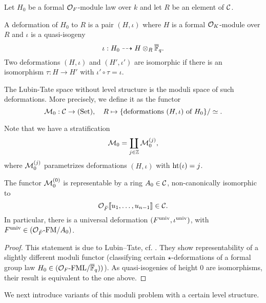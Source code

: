 \documentclass[../main.tex]{subfiles}
\begin{document}
Let $H_0$ be a formal $\mathcal{O}_F$-module law over $k$ and let $R$ be an element of 
$\mathcal{C}$.

\begin{defi}[Deformation]
  A deformation of $H_0$ to $R$ is a pair $(H, \iota)$ where
  $H$ is a formal $\mathcal{O}_K$-module over $R$ and $\iota$ is a quasi-isogeny
  \begin{equation*}
    \iota: H_0 \dashrightarrow H \otimes_R {\overline {\mathbb{F}}_q}.
  \end{equation*}
  Two deformations $(H, \iota)$ and $(H', \iota')$ are isomorphic if there is
  an isomorphism $\tau: H \to H'$ with $\iota' \circ \tau = \iota$. 
\end{defi}
The Lubin-Tate space without level structure is the moduli space of such deformations.
More precisely, we define it as the functor
\begin{equation*}
  \mathcal{M}_0: \mathcal{C} \to {(\mathrm{Set})}, \quad R \mapsto \{\text{deformations } (H, \iota) \text{
  of $H_0$}\}/\simeq.
\end{equation*}

Note that we have a stratification
\begin{equation*}
  \mathcal{M}_0 = \coprod_{j \in \mathbb{Z}} \mathcal{M}_0^{(j)},
\end{equation*}
where $\mathcal{M}_0^{(j)}$ parametrizes deformations $(H, \iota)$ with $\textnormal{ht}(\iota) = j$.

\begin{thm}[Representability of $\cM_0$]\label{thm:RepresentabilityOfDefSpaceWOLevel}
  The functor $\mathcal{M}_0^{(0)}$ is representable by a ring $A_0 \in \mathcal{C}$, non-canonically 
  isomorphic to
  \begin{equation*}
    \mathcal{O}_{\breve {F}}\llbracket u_1, \dots, u_{n-1} \rrbracket \in \mathcal{C}.
  \end{equation*}
In particular, there is a universal deformation
$(F^{\mathrm{univ}}, \iota^{\mathrm{univ}})$, with $F^{\mathrm{univ}} \in {({\mathcal{O}_{\breve {F}}}\text-\allowbreak\mathrm{FM}/{A_0})}$.
\begin{proof}
  This statement is due to Lubin--Tate, cf. \cite{LubinTate1966FormalModuli}. 
  They show representability of a slightly different moduli functor 
  (classifying certain $\star$-deformations of a formal group law $H_0 \in
  {({\mathcal{O}_F}\text-\allowbreak\mathrm{FML}/{\overline{\mathbb{F}}_q})})$). As quasi-isogenies of height $0$ are isomorphisms,
  their result is equivalent to the one above.
\end{proof}
\end{thm}

We next introduce variants of this moduli problem with a certain level structure.
\end{document}
